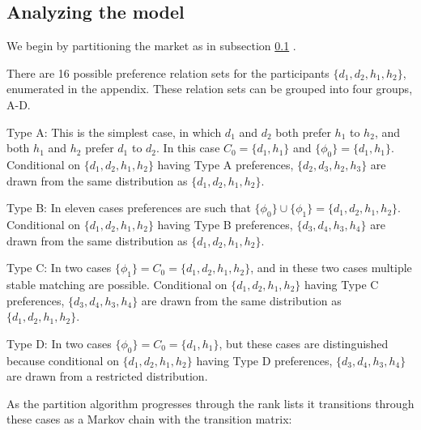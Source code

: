 \documentclass[WP]{AEA}
\begin{document}
\subsection{Analyzing the model} \label{subsect:partition}

We begin by partitioning the market as in subsection \ref{subsect:partition} . 

There are 16 possible preference relation sets for the participants $\{d_1,d_2,h_1,h_2\}$, enumerated in the appendix. These relation sets can be grouped into four groups, A-D.

Type A: This is the simplest case, in which $d_1$ and $d_2$ both prefer $h_1$ to $h_2$, and both $h_1$ and $h_2$ prefer $d_1$ to $d_2$.  In this case $C_0 =\{d_1,h_1\}$ and $\{\phi_0\}=\{d_1,h_1\}$. 
Conditional on $\{d_1,d_2,h_1,h_2\}$ having Type A preferences, $\{d_2,d_3,h_2,h_3\}$ are drawn from the same distribution as $\{d_1,d_2,h_1,h_2\}$.  

Type B: In eleven cases preferences are such that $ \{\phi_0\} \cup \{\phi_1\}=\{d_1,d_2,h_1,h_2\} $.
Conditional on $\{d_1,d_2,h_1,h_2\}$ having Type B preferences, $\{d_3,d_4,h_3,h_4\}$ are drawn from the same distribution as $\{d_1,d_2,h_1,h_2\}$.  

Type C: In two cases  $\{\phi_1\}=C_0 = \{d_1,d_2,h_1,h_2\}$, and in these two cases multiple stable matching are possible.  Conditional on $\{d_1,d_2,h_1,h_2\}$ having Type C preferences, $\{d_3,d_4,h_3,h_4\}$ are drawn from the same distribution as $\{d_1,d_2,h_1,h_2\}$.  

Type D: In two cases $\{\phi_0\}= C_0=\{d_1,h_1\}$, but these cases are distinguished because conditional on $\{d_1,d_2,h_1,h_2\}$ having Type D preferences, $\{d_3,d_4,h_3,h_4\}$ are drawn from  a restricted distribution.

As the partition algorithm progresses through the rank lists it transitions through these cases as a Markov chain with the transition matrix:
\end{document}
